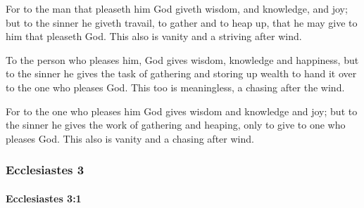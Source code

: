			\begin{versebox}
					\item[BHS] 
					\item[LXX] 
					\item[ASV] For to the man that pleaseth him God giveth wisdom, and knowledge, and joy; but to the sinner he giveth travail, to gather and to heap up, that he may give to him that pleaseth God. This also is vanity and a striving after wind.
					\item[NIV] To the person who pleases him, God gives wisdom, knowledge and happiness, but to the sinner he gives the task of gathering and storing up wealth to hand it over to the one who pleases God. This too is meaningless, a chasing after the wind.
					\item[NRSV] For to the one who pleases him God gives wisdom and knowledge and joy; but to the sinner he gives the work of gathering and heaping, only to give to one who pleases God. This also is vanity and a chasing after wind.
			\end{versebox}
	\subsubsection{Ecclesiastes 3} %
		\label{ECCLESIASTES-3}

		\paragraph{Ecclesiastes 3:1} %
			\label{ECCLESIASTES-3-1}

